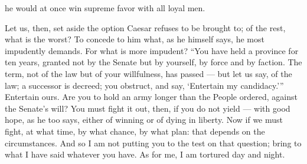 he would at once win supreme favor with all loyal men.

 Let us, then, set aside the option Caesar refuses to be brought to; of the rest, what is the worst? To concede to him what, as he himself says, he most impudently demands. For what is more impudent? ``You have held a province for ten years, granted not by the Senate but by yourself, by force and by faction. The term, not of the law but of your willfulness, has passed --- but let us say, of the law; a successor is decreed; you obstruct, and say, `Entertain my candidacy.''' Entertain ours. Are you to hold an army longer than the People ordered, against the Senate's will? You must fight it out, then, if you do not yield --- with good hope, as he too says, either of winning or of dying in liberty. Now if we must fight, at what time, by what chance, by what plan: that depends on the circumstances. And so I am not putting you to the test on that question; bring to what I have said whatever you have. As for me, I am tortured day and night.
